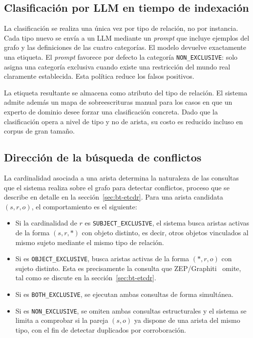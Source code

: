 \subsection{Clasificación por LLM en tiempo de indexación}

La clasificación se realiza una única vez por tipo de relación, no por instancia. Cada tipo nuevo se envía a un LLM mediante un \emph{prompt} que incluye ejemplos del grafo y las definiciones de las cuatro categorías. El modelo devuelve exactamente una etiqueta. El \emph{prompt} favorece por defecto la categoría \texttt{NON\_EXCLUSIVE}: solo asigna una categoría exclusiva cuando existe una restricción del mundo real claramente establecida. Esta política reduce los falsos positivos.

La etiqueta resultante se almacena como atributo del tipo de relación. El sistema admite además un mapa de sobreescrituras manual para los casos en que un experto de dominio desee forzar una clasificación concreta. Dado que la clasificación opera a nivel de tipo y no de arista, su costo es reducido incluso en corpus de gran tamaño.

\subsection{Dirección de la búsqueda de conflictos}

La cardinalidad asociada a una arista determina la naturaleza de las consultas que el sistema realiza sobre el grafo para detectar conflictos, proceso que se describe en detalle en la sección~\ref{sec:bt-etcdr}. Para una arista candidata $(s, r, o)$, el comportamiento es el siguiente:

\begin{itemize}
    \item Si la cardinalidad de $r$ es \texttt{SUBJECT\_EXCLUSIVE}, el sistema busca aristas activas de la forma $(s, r, *)$ con objeto distinto, es decir, otros objetos vinculados al mismo sujeto mediante el mismo tipo de relación.
    \item Si es \texttt{OBJECT\_EXCLUSIVE}, busca aristas activas de la forma $(*, r, o)$ con sujeto distinto. Esta es precisamente la consulta que ZEP/Graphiti~\cite{zep2025} omite, tal como se discute en la sección~\ref{sec:bt-etcdr}.
    \item Si es \texttt{BOTH\_EXCLUSIVE}, se ejecutan ambas consultas de forma simultánea.
    \item Si es \texttt{NON\_EXCLUSIVE}, se omiten ambas consultas estructurales y el sistema se limita a comprobar si la pareja $(s, o)$ ya dispone de una arista del mismo tipo, con el fin de detectar duplicados por corroboración.
\end{itemize}

